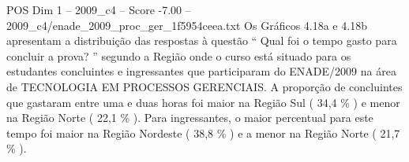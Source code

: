 \begin{textsample}{POS Dim 1 – 2009\_c4 – Score -7.00 – 2009\_c4/enade\_2009\_proc\_ger\_1f5954ceea.txt}
Os Gráficos 4.18a e 4.18b apresentam a distribuição das respostas à questão “ Qual foi o tempo gasto para concluir a prova? ” segundo a Região onde o curso está situado para os estudantes concluintes e ingressantes que participaram do ENADE/2009 na área de TECNOLOGIA EM PROCESSOS GERENCIAIS.
A proporção de concluintes que gastaram entre uma e duas horas foi maior na Região Sul ( 34,4 \% ) e menor na Região Norte ( 22,1 \% ).
Para ingressantes, o maior percentual para este tempo foi maior na Região Nordeste ( 38,8 \% ) e a menor na Região Norte ( 21,7 \% ).

\end{textsample}
